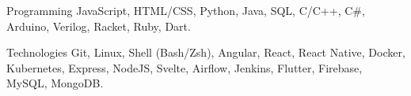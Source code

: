 

\begin{cvskills}

  \cvskill
    {Programming} %
    {JavaScript, HTML/CSS, Python, Java, SQL, C/C++, C\#,  Arduino, Verilog, Racket, Ruby, Dart.} %

  \cvskill
    {Technologies} %
    {Git, Linux, Shell (Bash/Zsh), Angular, React, React Native, Docker, Kubernetes, Express, NodeJS, Svelte, Airflow, Jenkins, Flutter, Firebase, MySQL, MongoDB.} %


\end{cvskills}

